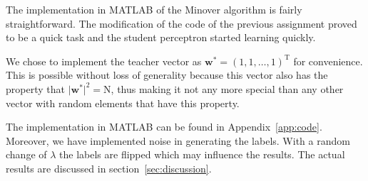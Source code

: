 The implementation in MATLAB of the Minover algorithm is fairly straightforward.
The modification of the code of the previous assignment proved to be a quick task and the student perceptron started learning quickly. 

We chose to implement the teacher vector as \(\mathbf{w}^{*} = (1, 1, \ldots,1)^\text{T}\) for convenience.
This is possible without loss of generality because this vector also has the property that \(\big|\mathbf{w}^{*}\big|^2 = \text{N}\), thus making it not any more special than any other vector with random elements that have this property.


The implementation in MATLAB can be found in Appendix~\ref{app:code}.
Moreover, we have implemented noise in generating the labels.
With a random change of \(\lambda\) the labels are flipped which may influence the results.
The actual results are discussed in section~\ref{sec:discussion}.
